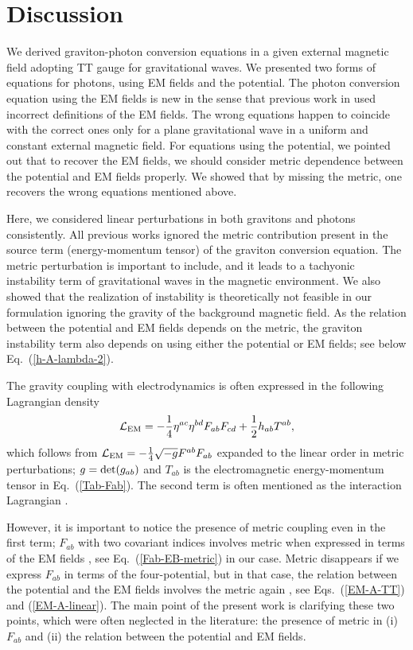 \documentclass[twocolumn,amsmath,amssymb]{revtex4}
\newcommand{\bea}{\begin{eqnarray}}
\newcommand{\eea}{\end{eqnarray}}
\begin{document}
%
%
%
\section{Discussion}
                                        \label{sec:discussion}

We derived graviton-photon conversion equations in a given external magnetic field adopting TT gauge for gravitational waves. We presented two forms of equations for photons, using EM fields and the potential. The photon conversion equation using the EM fields is new in the sense that previous work in \cite{Palessandro-Rothman-2023} used incorrect definitions of the EM fields. The wrong equations happen to coincide with the correct ones only for a plane gravitational wave in a uniform and constant external magnetic field. For equations using the potential, we pointed out that to recover the EM fields, we should consider metric dependence between the potential and EM fields properly. We showed that by missing the metric, one recovers the wrong equations mentioned above.

Here, we considered linear perturbations in both gravitons and photons consistently. All previous works ignored the metric contribution present in the source term (energy-momentum tensor) of the graviton conversion equation. The metric perturbation is important to include, and it leads to a tachyonic instability term of gravitational waves in the magnetic environment. We also showed that the realization of instability is theoretically not feasible in our formulation ignoring the gravity of the background magnetic field. As the relation between the potential and EM fields depends on the metric, the graviton instability term also depends on using either the potential or EM fields; see below Eq.\ (\ref{h-A-lambda-2}).

The gravity coupling with electrodynamics is often expressed in the following Lagrangian density
\bea
   {\cal L}_{\rm EM}
       = - {1 \over 4} \eta^{ac} \eta^{bd} F_{ab} F_{cd}
       + {1 \over 2} h_{ab} T^{ab},
\eea
which follows from ${\cal L}_{\rm EM} = - {1 \over 4} \sqrt{-g} F^{ab} F_{ab}$ expanded to the linear order in metric perturbations; $g = {\rm det}(g_{ab})$ and $T_{ab}$ is the electromagnetic energy-momentum tensor in Eq.\ (\ref{Tab-Fab}). The second term is often mentioned as the interaction Lagrangian \cite{Boccaletti-1967}.

However, it is important to notice the presence of metric coupling even in the first term; $F_{ab}$ with two covariant indices involves metric when expressed in terms of the EM fields \cite{EM-definition, Hwang-Noh-2023-EM-NL}, see Eq.\ (\ref{Fab-EB-metric}) in our case. Metric disappears if we express $F_{ab}$ in terms of the four-potential, but in that case, the relation between the potential and the EM fields involves the metric again \cite{Hwang-Noh-2023-EM-NL}, see Eqs.\ (\ref{EM-A-TT}) and (\ref{EM-A-linear}). The main point of the present work is clarifying these two points, which were often neglected in the literature: the presence of metric in (i) $F_{ab}$ and (ii) the relation between the potential and EM fields.
\end{document}
